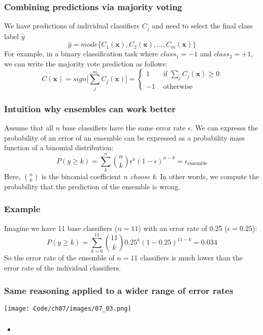 \documentclass{beamer}
\begin{document}
\begin{frame}
  \frametitle{Combining predictions via majority voting}
  We have predictions of individual classifiers $C_j$ and need to select the final class label $\hat{y}$
  \[
  \hat{y} = mode \{ C_1 (\mathbf{x}), C_2 (\mathbf{x}), \dots, C_m (\mathbf{x}) \}
  \]
  For example, in a binary classification task where $class_1 = -1$ and $class_2 = +1$, we can write the majority vote prediction as follows:
  \[
  C(\mathbf{x}) = sign \Bigg[ \sum_{j}^{m} C_j (\mathbf{x}) \Bigg] = \begin{cases}
        1 & \text{ if } \sum_j C_j (\mathbf{x}) \ge 0 \\
        -1 & \text{ otherwise }
     \end{cases}
  \]
\end{frame}

\begin{frame}
  \frametitle{Intuition why ensembles can work better}
  Assume that all $n$ base classifiers have the same error rate $\epsilon$. We can expresss the probability of an error of an ensemble can be expressed as a probability mass function of a binomial distribution:
  \[
  P(y \ge k) = \sum_{k}^{n} \binom{n}{k} \epsilon^k (1 - \epsilon)^{n-k} = \epsilon_{\text{ensemble}}
  \]
  Here, $\binom{n}{k}$ is the binomial coefficient \textit{n choose k}. In other words, we compute the probability that the prediction of the ensemble is wrong.
\end{frame}

\begin{frame}
  \frametitle{Example}
  Imagine we have 11 base classifiers ($n=11$) with an error rate of 0.25 ($\epsilon = 0.25$):
  \[
  P(y \ge k) = \sum_{k=6}^{11} \binom{11}{k} 0.25^k (1 - 0.25)^{11-k} = 0.034
  \]
  So the error rate of the ensemble of $n=11$ classifiers is much lower than the error rate of the individual classifiers.
\end{frame}

\begin{frame}
  \frametitle{Same reasoning applied to a wider range of error rates}
  \center
  \texttt{[image: Code/ch07/images/07\_03.png]}
\end{frame}

\begin{frame}
  \frametitle{}
  \begin{itemize}
  \item
  \end{itemize}
\end{frame}
\end{document}
